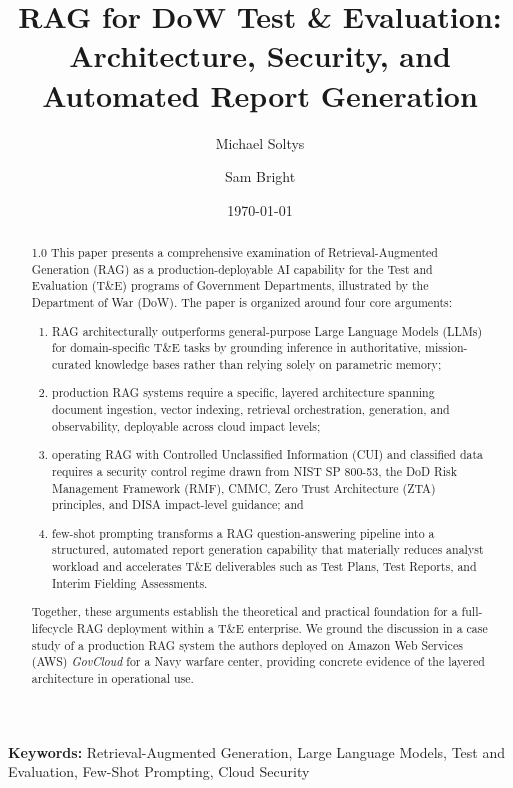 \documentclass[12pt,letterpaper]{article}
\title{\bfseries\centering RAG for DoW Test \& Evaluation: Architecture, Security, and Automated Report Generation}
\author[1]{Michael Soltys}
\author[1]{Sam Bright}
\affil[1]{GBL Systems Corp.}
\date{\today}
\begin{document}
\maketitle

\begin{abstract}
\begin{spacing}{1.0}
This paper presents a comprehensive examination of Retrieval-Augmented Generation (RAG) as a production-deployable AI capability for the Test and Evaluation (T\&E) programs of Government Departments, illustrated by the Department of War (DoW). The paper is organized around four core arguments:
\begin{enumerate}
\item RAG architecturally outperforms general-purpose Large Language Models (LLMs) for domain-specific T\&E tasks by grounding inference in authoritative, mission-curated knowledge bases rather than relying solely on parametric memory;
\item production RAG systems require a specific, layered architecture spanning document ingestion, vector indexing, retrieval orchestration, generation, and observability, deployable across cloud impact levels;
\item operating RAG with Controlled Unclassified Information (CUI) and classified data requires a security control regime drawn from NIST SP 800-53, the DoD Risk Management Framework (RMF), CMMC, Zero Trust Architecture (ZTA) principles, and DISA impact-level guidance; and
\item few-shot prompting transforms a RAG question-answering pipeline into a structured, automated report generation capability that materially reduces analyst workload and accelerates T\&E deliverables such as Test Plans, Test Reports, and Interim Fielding Assessments.
\end{enumerate}
Together, these arguments establish the theoretical and practical foundation for a full-lifecycle RAG deployment within a T\&E enterprise. We ground the discussion in a case study of a production RAG system the authors deployed on Amazon Web Services (AWS) \textit{GovCloud} for a Navy warfare center, providing concrete evidence of the layered architecture in operational use.
\end{spacing}
\end{abstract}

\vspace{1em}
\noindent\textbf{Keywords:}
Retrieval-Augmented Generation, Large Language Models, Test and Evaluation, Few-Shot Prompting, Cloud Security
\end{document}
